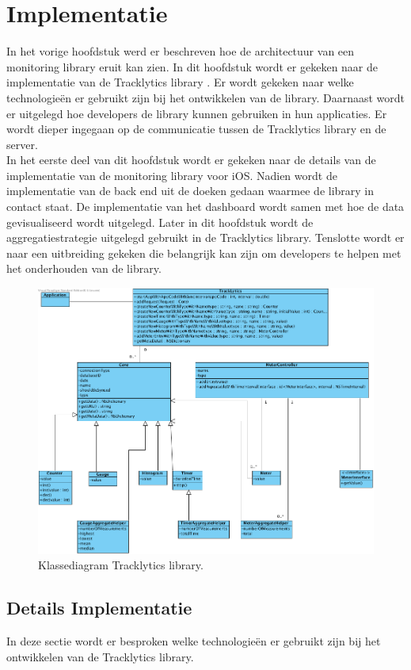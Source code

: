 \chapter{Implementatie}
In het vorige hoofdstuk werd er beschreven hoe de architectuur van een monitoring library eruit kan zien. In dit hoofdstuk wordt er gekeken naar de implementatie van de Tracklytics library \cite{Tracklytics}.
Er wordt gekeken naar welke technologie\"en er gebruikt zijn bij het ontwikkelen van de library. Daarnaast wordt er uitgelegd hoe developers de library kunnen gebruiken in hun applicaties. Er wordt dieper ingegaan op de communicatie tussen de Tracklytics library en de server. \\

In het eerste deel van dit hoofdstuk wordt er gekeken naar de details van de implementatie van de monitoring library voor iOS. Nadien wordt de implementatie van de back end uit de doeken gedaan waarmee de library in contact staat. De implementatie van het dashboard wordt samen met hoe de data gevisualiseerd wordt uitgelegd. Later in dit hoofdstuk wordt de aggregatiestrategie uitgelegd gebruikt in de Tracklytics library.  Tenslotte wordt er naar een uitbreiding gekeken die belangrijk kan zijn om developers te helpen met het onderhouden van de library. 


\begin{figure}[!h]
  \centering
  \includegraphics[scale=0.4]{Afbeeldingen/Implementatie/ClassDiagram}
  \caption{Klassediagram Tracklytics library.}
  \label{fig:fig}
\end{figure}
\section{Details Implementatie}
In deze sectie wordt er besproken welke technologie\"en er gebruikt zijn bij het ontwikkelen van de Tracklytics library.

